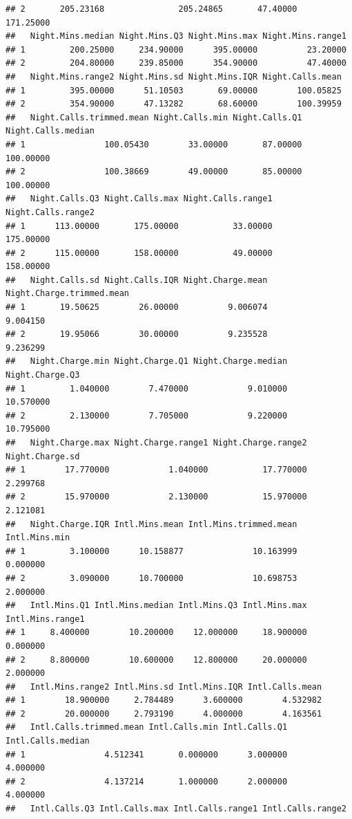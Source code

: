 \documentclass{article}\usepackage[]{graphicx}\usepackage[]{color}
\makeatletter
\newenvironment{kframe}{%
 \def\at@end@of@kframe{}%
 \ifinner\ifhmode%
  \def\at@end@of@kframe{\end{minipage}}%
  \begin{minipage}{\columnwidth}%
 \fi\fi%
 \def\FrameCommand##1{\hskip\@totalleftmargin \hskip-\fboxsep
 \colorbox{shadecolor}{##1}\hskip-\fboxsep
     \hskip-\linewidth \hskip-\@totalleftmargin \hskip\columnwidth}%
 \MakeFramed {\advance\hsize-\width
   \@totalleftmargin\z@ \linewidth\hsize
   \@setminipage}}%
 {\par\unskip\endMakeFramed%
 \at@end@of@kframe}
\newenvironment{knitrout}{}{} %
\makeatother
\begin{document}
\begin{description}
\begin{knitrout}
\begin{kframe}
\begin{verbatim}
## 2       205.23168               205.24865       47.40000     171.25000
##   Night.Mins.median Night.Mins.Q3 Night.Mins.max Night.Mins.range1
## 1         200.25000     234.90000      395.00000          23.20000
## 2         204.80000     239.85000      354.90000          47.40000
##   Night.Mins.range2 Night.Mins.sd Night.Mins.IQR Night.Calls.mean
## 1         395.00000      51.10503       69.00000        100.05825
## 2         354.90000      47.13282       68.60000        100.39959
##   Night.Calls.trimmed.mean Night.Calls.min Night.Calls.Q1 Night.Calls.median
## 1                100.05430        33.00000       87.00000          100.00000
## 2                100.38669        49.00000       85.00000          100.00000
##   Night.Calls.Q3 Night.Calls.max Night.Calls.range1 Night.Calls.range2
## 1      113.00000       175.00000           33.00000          175.00000
## 2      115.00000       158.00000           49.00000          158.00000
##   Night.Calls.sd Night.Calls.IQR Night.Charge.mean Night.Charge.trimmed.mean
## 1       19.50625        26.00000          9.006074                  9.004150
## 2       19.95066        30.00000          9.235528                  9.236299
##   Night.Charge.min Night.Charge.Q1 Night.Charge.median Night.Charge.Q3
## 1         1.040000        7.470000            9.010000       10.570000
## 2         2.130000        7.705000            9.220000       10.795000
##   Night.Charge.max Night.Charge.range1 Night.Charge.range2 Night.Charge.sd
## 1        17.770000            1.040000           17.770000        2.299768
## 2        15.970000            2.130000           15.970000        2.121081
##   Night.Charge.IQR Intl.Mins.mean Intl.Mins.trimmed.mean Intl.Mins.min
## 1         3.100000      10.158877              10.163999      0.000000
## 2         3.090000      10.700000              10.698753      2.000000
##   Intl.Mins.Q1 Intl.Mins.median Intl.Mins.Q3 Intl.Mins.max Intl.Mins.range1
## 1     8.400000        10.200000    12.000000     18.900000         0.000000
## 2     8.800000        10.600000    12.800000     20.000000         2.000000
##   Intl.Mins.range2 Intl.Mins.sd Intl.Mins.IQR Intl.Calls.mean
## 1        18.900000     2.784489      3.600000        4.532982
## 2        20.000000     2.793190      4.000000        4.163561
##   Intl.Calls.trimmed.mean Intl.Calls.min Intl.Calls.Q1 Intl.Calls.median
## 1                4.512341       0.000000      3.000000          4.000000
## 2                4.137214       1.000000      2.000000          4.000000
##   Intl.Calls.Q3 Intl.Calls.max Intl.Calls.range1 Intl.Calls.range2

\end{verbatim}
\end{kframe}
\end{knitrout}
\end{description}
\end{document}
